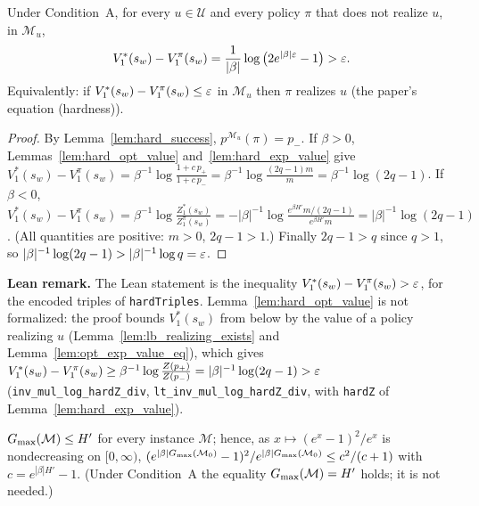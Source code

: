 \begin{lemma}\label{lem:hard_eps_suboptimal}
\leanok
Under Condition~A, for every $u \in \mathcal U$ and every policy $\pi$ that does not realize
$u$, in $\mathcal M_u$,
\[
  V^*_1(s_w) - V^\pi_1(s_w) = \frac{1}{|\beta|}\log\big(2e^{|\beta|\varepsilon} - 1\big) > \varepsilon .
\]
Equivalently: if $V^*_1(s_w) - V^\pi_1(s_w) \le \varepsilon$ in $\mathcal M_u$ then $\pi$ realizes $u$
(the paper's equation (hardness)).
\end{lemma}

\begin{proof}
\leanok
{}
By Lemma~\ref{lem:hard_success}, $p^{\mathcal M_u}(\pi) = p_-$. If $\beta > 0$,
Lemmas~\ref{lem:hard_opt_value} and~\ref{lem:hard_exp_value} give
$V^*_1(s_w) - V^\pi_1(s_w) = \beta^{-1}\log\frac{1 + c\,p_+}{1 + c\,p_-} = \beta^{-1}\log\frac{(2q-1)m}{m} = \beta^{-1}\log(2q-1)$.
If $\beta < 0$, $V^*_1(s_w) - V^\pi_1(s_w) = \beta^{-1}\log\frac{Z^*_1(s_w)}{Z^\pi_1(s_w)}
= -|\beta|^{-1}\log\frac{e^{\beta H'} m/(2q-1)}{e^{\beta H'} m} = |\beta|^{-1}\log(2q-1)$.
(All quantities are positive: $m > 0$, $2q - 1 > 1$.) Finally $2q - 1 > q$ since $q > 1$, so
$|\beta|^{-1}\log(2q-1) > |\beta|^{-1}\log q = \varepsilon$.
\end{proof}

\textbf{Lean remark.} The Lean statement is the inequality $V^*_1(s_w) - V^\pi_1(s_w) > \varepsilon$, for the encoded
triples of \texttt{hardTriples}. Lemma~\ref{lem:hard_opt_value} is not formalized: the proof bounds
$V^*_1(s_w)$ from below by the value of a policy realizing $u$ (Lemma~\ref{lem:lb_realizing_exists} and
Lemma~\ref{lem:opt_exp_value_eq}), which gives
$V^*_1(s_w) - V^\pi_1(s_w) \ge \beta^{-1}\log\frac{Z(p_+)}{Z(p_-)} = |\beta|^{-1}\log(2q - 1) > \varepsilon$
(\texttt{inv\_mul\_log\_hardZ\_div}, \texttt{lt\_inv\_mul\_log\_hardZ\_div}, with \texttt{hardZ} of
Lemma~\ref{lem:hard_exp_value}).

\begin{lemma}\label{lem:hard_gmax}
\leanok
$G_{\max}(\mathcal M) \le H'$ for every instance $\mathcal M$; hence, as $x \mapsto (e^x - 1)^2/e^x$ is
nondecreasing on $[0, \infty)$,
$(e^{|\beta|G_{\max}(\mathcal M_0)} - 1)^2/e^{|\beta|G_{\max}(\mathcal M_0)} \le c^2/(c+1)$ with $c = e^{|\beta|H'} - 1$.
(Under Condition~A the equality $G_{\max}(\mathcal M) = H'$ holds; it is not needed.)
\end{lemma}

